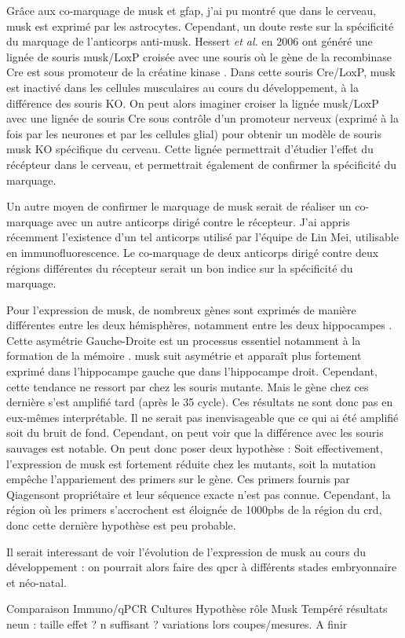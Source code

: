 Grâce aux co-marquage de \gls{musk} et \gls{gfap}, j'ai pu montré que dans le cerveau, \gls{musk} est exprimé par les astrocytes. Cependant,  un doute reste sur la spécificité du marquage de l'anticorps anti-\gls{musk}. Hessert \emph{et al.} en 2006 ont généré une lignée de souris \gls{musk}/LoxP croisée avec une souris où le gène de la recombinase Cre est sous promoteur de la créatine kinase \cite{Hesser2006}. Dans cette souris Cre/LoxP, \gls{musk} est inactivé dans les cellules musculaires au cours du développement, à la différence des souris KO. On peut alors imaginer croiser la lignée \gls{musk}/LoxP avec une lignée de souris Cre sous contrôle d'un promoteur nerveux (exprimé à la fois par les neurones et par les cellules glial) pour obtenir un modèle de souris \gls{musk} KO spécifique du cerveau. Cette lignée permettrait d'étudier l'effet du récépteur dans le cerveau, et permettrait également de confirmer la spécificité du marquage.

Un autre moyen de confirmer le marquage de \gls{musk} serait de réaliser un co-marquage avec un autre anticorps dirigé contre le récepteur. J'ai appris récemment l'existence d'un tel anticorps utilisé par l'équipe de Lin Mei, utilisable en immunofluorescence. Le co-marquage de deux anticorps dirigé contre deux régions différentes du récepteur serait un bon indice sur la spécificité du marquage. 

Pour l'expression de \gls{musk}, de nombreux gènes sont exprimés de manière différentes entre les deux hémisphères, notamment entre les deux hippocampes \cite{Moskal2006}. Cette asymétrie Gauche-Droite est un processus essentiel notamment à la formation de la mémoire \cite{Shimbo2018}. \gls{musk} suit asymétrie et apparaît plus fortement exprimé dans l'hippocampe gauche que dans l'hippocampe droit. Cependant, cette tendance ne ressort par chez les souris mutante. Mais le gène chez ces dernière s'est amplifié tard (après le 35 cycle). Ces résultats ne sont donc pas en eux-mêmes interprétable. Il ne serait pas inenvisageable que ce qui ai été amplifié soit du bruit de fond. Cependant, on peut voir que la différence avec les souris sauvages est notable. On peut donc poser deux hypothèse : Soit effectivement, l'expression de \gls{musk} est fortement réduite chez les mutants, soit la mutation empêche l'appariement des primers sur le gène. Ces primers fournis par Qiagen\texttrademark sont propriétaire et leur séquence exacte n'est pas connue. Cependant, la région où les primers s'accrochent est éloignée de 1000pbs de la région du \gls{crd}, donc cette dernière hypothèse est peu probable.

Il serait interessant de voir l'évolution de l'expression de \gls{musk} au cours du développement : on pourrait alors faire des \gls{qpcr} à différents stades embryonnaire et néo-natal.

Comparaison Immuno/qPCR
Cultures
Hypothèse rôle Musk
Tempéré résultats neun : taille effet ? n suffisant ? variations lors coupes/mesures.
 A finir